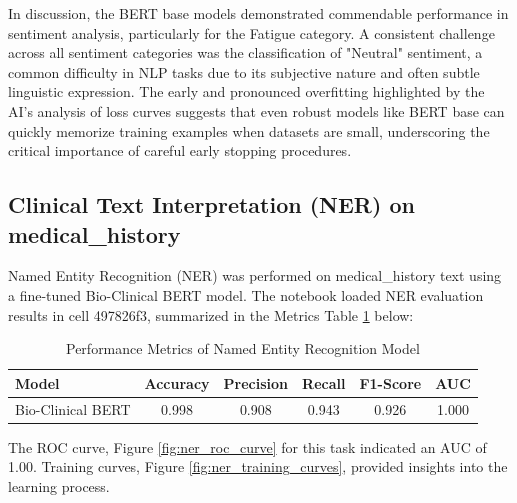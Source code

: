 In discussion, the BERT base models demonstrated commendable performance in sentiment analysis, particularly for the Fatigue category. A consistent challenge across all sentiment categories was the classification of "Neutral" sentiment, a common difficulty in NLP tasks due to its subjective nature and often subtle linguistic expression. The early and pronounced overfitting highlighted by the AI's analysis of loss curves suggests that even robust models like BERT base can quickly memorize training examples when datasets are small, underscoring the critical importance of careful early stopping procedures.

\subsection{Clinical Text Interpretation (NER) on medical\_history}

Named Entity Recognition (NER) was performed on medical\_history text using a fine-tuned Bio-Clinical BERT model. The notebook loaded NER evaluation results in cell 497826f3, summarized in the Metrics Table \ref{tab:ner_performance} below:

\begin{table}[htbp]
    \centering
    \caption{Performance Metrics of Named Entity Recognition Model}
    \label{tab:ner_performance}
    \begin{tabular}{lccccc}
        \hline
        \textbf{Model} & \textbf{Accuracy} & \textbf{Precision} & \textbf{Recall} & \textbf{F1-Score} & \textbf{AUC} \\
        \hline
        Bio-Clinical BERT & 0.998 & 0.908 & 0.943 & 0.926 & 1.000 \\
        \hline
    \end{tabular}
\end{table}

The ROC curve, Figure \ref{fig:ner_roc_curve} for this task indicated an AUC of 1.00. Training curves, Figure \ref{fig:ner_training_curves}, provided insights into the learning process.


